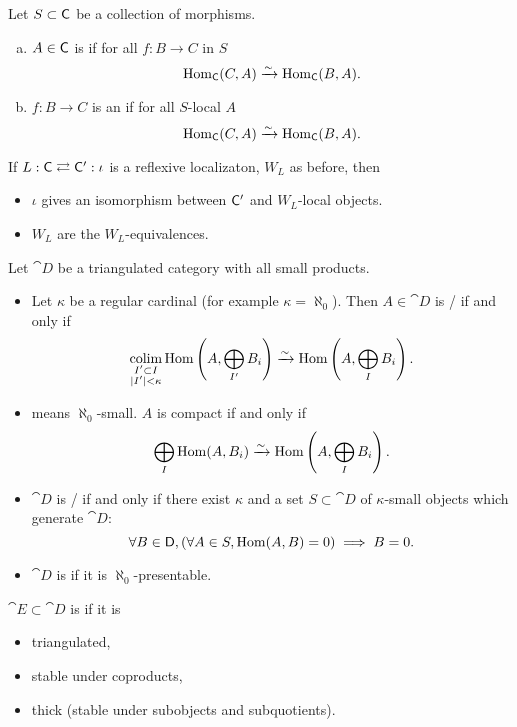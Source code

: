 \begin{definition}
Let $S\subset \mathsf{C}$ be a collection of morphisms.
\begin{enumerate}[a)]
\item $A\in \mathsf{C}$ is  if for all $f:B\to C$ in $S$
\[
\operatorname{Hom}_\mathsf{C}(C,A) \xrightarrow{\sim} \operatorname{Hom}_\mathsf{C}(B,A).
\]
\item $f:B\to C$ is an  if for all $S$-local $A$
\[
\operatorname{Hom}_{\mathsf{C}}(C,A) \xrightarrow{\sim} \operatorname{Hom}_\mathsf{C}(B,A).
\]
\end{enumerate}
\end{definition}
\begin{lemma}
If $L:\mathsf{C} \rightleftarrows \mathsf{C}':\iota$ is a reflexive localizaton, $W_L$ as before, then
\begin{itemize}
\item $\iota$ gives an isomorphism between $\mathsf{C}'$ and $W_L$-local objects.
\item $W_L$ are the $W_L$-equivalences.
\end{itemize}
\end{lemma}
\begin{definition}
Let $\cat{D}$ be a triangulated category with all small products.
\begin{itemize}
\item Let $\kappa$ be a regular cardinal (for example $\kappa=\aleph_0$). Then $A\in
\cat{D}$ is / if and only if
\[
\operatorname*{colim}_{\substack{I' \subset I \\ |I'|<\kappa}} \operatorname{Hom}\left( A,\bigoplus_{I'}B_i \right)
\xrightarrow{\sim} \operatorname{Hom}\left( A, \bigoplus_I B_i \right)
.\]
\item {} means $\aleph_0$-small. $A$ is compact if and only if
\[
\bigoplus_I \operatorname{Hom}(A,B_i) \xrightarrow{\sim} \operatorname{Hom} \left( A,\bigoplus_{I}B_i \right)
.\]
\item $\cat{D}$ is / if and only if there exist
$\kappa$ and a set $S\subset \cat{D}$ of $\kappa$-small objects which generate $\cat{D}$:
\[
\forall B\in \mathsf{D},\left( \forall A\in S, \operatorname{Hom}(A,B)=0 \right) \implies B = 0
.\]
\item $\cat{D}$ is  if it is $\aleph_0$-presentable.
\end{itemize}
\end{definition}

\begin{definition}
$\cat{E}\subset \cat{D}$ is  if it is
\begin{itemize}
\item triangulated,
\item stable under coproducts,
\item thick (stable under subobjects and subquotients).
\end{itemize}
\end{definition}

